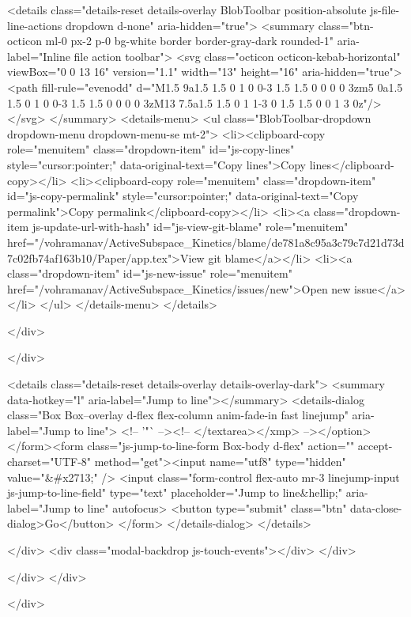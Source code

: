   <details class="details-reset details-overlay BlobToolbar position-absolute js-file-line-actions dropdown d-none" aria-hidden="true">
    <summary class="btn-octicon ml-0 px-2 p-0 bg-white border border-gray-dark rounded-1" aria-label="Inline file action toolbar">
      <svg class="octicon octicon-kebab-horizontal" viewBox="0 0 13 16" version="1.1" width="13" height="16" aria-hidden="true"><path fill-rule="evenodd" d="M1.5 9a1.5 1.5 0 1 0 0-3 1.5 1.5 0 0 0 0 3zm5 0a1.5 1.5 0 1 0 0-3 1.5 1.5 0 0 0 0 3zM13 7.5a1.5 1.5 0 1 1-3 0 1.5 1.5 0 0 1 3 0z"/></svg>
    </summary>
    <details-menu>
      <ul class="BlobToolbar-dropdown dropdown-menu dropdown-menu-se mt-2">
        <li><clipboard-copy role="menuitem" class="dropdown-item" id="js-copy-lines" style="cursor:pointer;" data-original-text="Copy lines">Copy lines</clipboard-copy></li>
        <li><clipboard-copy role="menuitem" class="dropdown-item" id="js-copy-permalink" style="cursor:pointer;" data-original-text="Copy permalink">Copy permalink</clipboard-copy></li>
        <li><a class="dropdown-item js-update-url-with-hash" id="js-view-git-blame" role="menuitem" href="/vohramanav/ActiveSubspace_Kinetics/blame/de781a8c95a3c79c7d21d73d7c02fb74af163b10/Paper/app.tex">View git blame</a></li>
          <li><a class="dropdown-item" id="js-new-issue" role="menuitem" href="/vohramanav/ActiveSubspace_Kinetics/issues/new">Open new issue</a></li>
      </ul>
    </details-menu>
  </details>

  </div>

  </div>

  <details class="details-reset details-overlay details-overlay-dark">
    <summary data-hotkey="l" aria-label="Jump to line"></summary>
    <details-dialog class="Box Box--overlay d-flex flex-column anim-fade-in fast linejump" aria-label="Jump to line">
      <!-- '"` --><!-- </textarea></xmp> --></option></form><form class="js-jump-to-line-form Box-body d-flex" action="" accept-charset="UTF-8" method="get"><input name="utf8" type="hidden" value="&#x2713;" />
        <input class="form-control flex-auto mr-3 linejump-input js-jump-to-line-field" type="text" placeholder="Jump to line&hellip;" aria-label="Jump to line" autofocus>
        <button type="submit" class="btn" data-close-dialog>Go</button>
</form>    </details-dialog>
  </details>


  </div>
  <div class="modal-backdrop js-touch-events"></div>
</div>

    </div>
  </div>

  </div>

